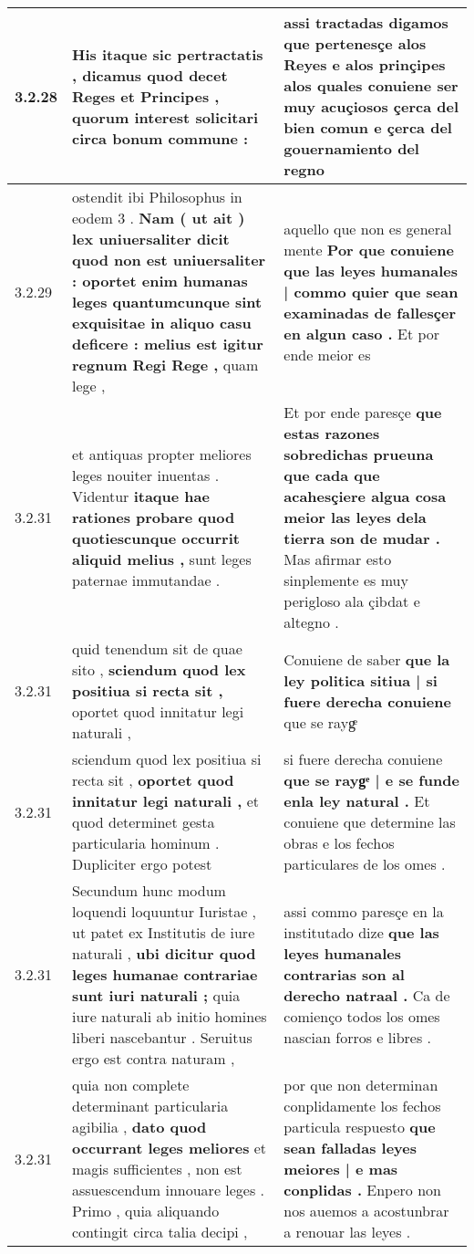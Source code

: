 \begin{tabular}{|p{1cm}|p{6.5cm}|p{6.5cm}|}
3.2.28 & His itaque sic pertractatis , \textbf{ dicamus quod decet Reges et Principes , } quorum interest solicitari circa bonum commune : & assi tractadas digamos \textbf{ que pertenesçe alos Reyes e alos prinçipes alos quales conuiene ser muy acuçiosos çerca del bien comun } e çerca del gouernamiento del regno \\\hline
3.2.29 & ostendit ibi Philosophus in eodem 3 . \textbf{ Nam ( ut ait ) lex uniuersaliter dicit quod non est uniuersaliter : oportet enim humanas leges quantumcunque sint exquisitae in aliquo casu deficere : melius est igitur regnum Regi Rege , } quam lege , & aquello que non es general mente \textbf{ Por que conuiene que las leyes humanales | commo quier que sean examinadas de fallesçer en algun caso . } Et por ende meior es \\\hline
3.2.31 & et antiquas propter meliores leges nouiter inuentas . Videntur \textbf{ itaque hae rationes probare quod quotiescunque occurrit aliquid melius , } sunt leges paternae immutandae . & Et por ende paresçe \textbf{ que estas razones sobredichas prueuna que cada que acahesçiere algua cosa meior las leyes dela tierra son de mudar . } Mas afirmar esto sinplemente es muy perigloso ala çibdat e altegno . \\\hline
3.2.31 & quid tenendum sit de quae sito , \textbf{ sciendum quod lex positiua si recta sit , } oportet quod innitatur legi naturali , & Conuiene de saber \textbf{ que la ley politica sitiua | si fuere derecha conuiene } que se raygͤ \\\hline
3.2.31 & sciendum quod lex positiua si recta sit , \textbf{ oportet quod innitatur legi naturali , } et quod determinet gesta particularia hominum . Dupliciter ergo potest & si fuere derecha conuiene \textbf{ que se raygͤ | e se funde enla ley natural . } Et conuiene que determine las obras e los fechos particulares de los omes . \\\hline
3.2.31 & Secundum hunc modum loquendi loquuntur Iuristae , ut patet ex Institutis de iure naturali , \textbf{ ubi dicitur quod leges humanae contrariae sunt iuri naturali ; } quia iure naturali ab initio homines liberi nascebantur . Seruitus ergo est contra naturam , & assi commo paresçe en la institutado dize \textbf{ que las leyes humanales contrarias son al derecho natraal . } Ca de comienço todos los omes nascian forros e libres . \\\hline
3.2.31 & quia non complete determinant particularia agibilia , \textbf{ dato quod occurrant leges meliores } et magis sufficientes , non est assuescendum innouare leges . Primo , quia aliquando contingit circa talia decipi , & por que non determinan conplidamente los fechos particula respuesto \textbf{ que sean falladas leyes meiores | e mas conplidas . } Enpero non nos auemos a acostunbrar a renouar las leyes . \\\hline

\end{tabular}
